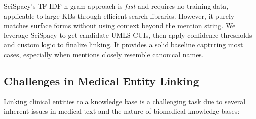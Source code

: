 SciSpacy's TF-IDF n-gram approach is \emph{fast} and requires no training data, applicable to large KBs through efficient search libraries. However, it purely matches surface forms without using context beyond the mention string. We leverage SciSpacy to get candidate UMLS CUIs, then apply confidence thresholds and custom logic to finalize linking. It provides a solid baseline capturing most cases, especially when mentions closely resemble canonical names.

\subsection{Challenges in Medical Entity Linking}

Linking clinical entities to a knowledge base is a challenging task due to several inherent issues in medical text and the nature of biomedical knowledge bases:

